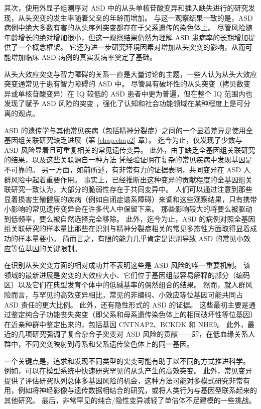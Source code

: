 其次，使用外显子组测序对 ASD 中的从头单核苷酸变异和插入缺失进行的研究发现，从头突变的发生率随着父亲的年龄而增加。 与这一观察结果一致的是，ASD 病例中绝大多数有害的从头序列突变都存在于父系遗传的染色体上。 尽管风险随年龄增长的绝对增加很小，但这一观察结果仍然为理解 ASD 患病率的长期增加提供了一个概念框架。 它还为进一步研究环境因素对增加从头突变的影响，从而可能增加临床 ASD 病例的真实发病率奠定了基础。

从头大效应突变与智力障碍的关系一直是大量讨论的主题，一些人认为从头大效应突变通常见于患有智力障碍的 ASD 中。 尽管具有破坏性的从头突变（拷贝数变异或单核苷酸变异）在 IQ 较低的 ASD 患者中更为普遍，但在整个 IQ 范围内也发现了赋予 ASD 风险的突变 ，强化了认知和社会功能领域在某种程度上是可分离的观点。

ASD 的遗传学与其他常见疾病（包括精神分裂症）之间的一个显着差异是使用全基因组关联研究缺乏进展（第 \ref{chap:chap2} 章）。 迄今为止，仅发现了少数与 ASD 风险显着且可重复相关的常见遗传变异。 此外，由于缺乏全基因组关联研究的结果，以及这些关联源自一种方法 凭经验证明在复杂的常见疾病中发现基因是不可靠的。 另一方面，如前所述，有非常有力的证据表明，共同变异在 ASD 人群风险中起着重要作用。 事实上，已经推断出这种变异的贡献程度的全基因组关联研究一致认为，大部分的脆弱性存在于共同变异中。 人们可以通过注意到那些显着损害生殖健康的疾病（例如自闭症谱系障碍）来调和这些观察结果，只有携带小影响的常见遗传变异会在许多代人中保留下来。 那些影响较大的将要么被驱动到低频率，要么被自然选择完全移除。 此外，迄今为止，ASD 的病例对照全基因组关联研究的样本量比那些在识别与精神分裂症相关的常见多态性方面取得显着成功的样本量要小。 简而言之，有限的能力几乎肯定是识别导致 ASD 的常见小效应等位基因的关键限制。

在识别从头突变方面的相对成功并不表明这些是 ASD 风险的唯一重要机制。 该领域的最新进展是突变的大效应大小、它们位于基因组最容易解释的部分（编码区）以及它们在典型发育个体中的低碱基率的偶然组合的结果。 然而，就人群风险而言，与罕见的高效变异相比，常见的非编码、小效应等位基因可能共同占 ASD 责任的更大比例。 此外，还有隐性形式的 ASD 的证据。 这些最初主要是通过鉴定纯合子功能丧失突变（即父系和母系遗传染色体上的相同破坏性等位基因）在近亲种群中鉴定出来的，包括基因 CNTNAP2、BCKDK 和 NHE9。 此外，最近的几项研究强调了复合杂合子突变对 ASD 风险的贡献——即，在低血缘关系人群中，不同突变映射到母系和父系遗传染色体上的同一基因。

一个关键点是，追求和发现不同类型的突变可能有助于以不同的方式推进科学。 例如，可以在模型系统中快速研究罕见的从头产生的高效突变。 此外，常见变异提供了评估研究队列总体多基因风险的机会，这种方法可能对多模式研究非常有用，例如将神经影像与遗传数据相结合的研究，或将人类行为与基因型联系起来的其他研究。 最后，非常罕见的纯合/隐性变异减轻了单倍体不足建模的一些挑战。

